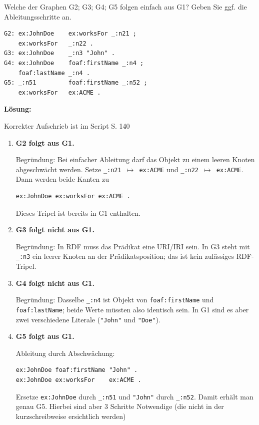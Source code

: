 \documentclass[a4paper]{article}
\begin{document}
Welche der Graphen G2; G3; G4; G5 folgen einfach aus G1?
Geben Sie ggf. die Ableitungsschritte an.

\begin{lstlisting}
G2: ex:JohnDoe    ex:worksFor _:n21 ;
    ex:worksFor   _:n22 .
G3: ex:JohnDoe    _:n3 "John" .
G4: ex:JohnDoe    foaf:firstName _:n4 ;
    foaf:lastName _:n4 .
G5: _:n51         foaf:firstName _:n52 ;
    ex:worksFor   ex:ACME .
\end{lstlisting}

\textbf{Lösung:}

Korrekter Aufschrieb ist im Script S. 140

\begin{enumerate}
    \item \textbf{G2 folgt aus G1.}

    Begründung: Bei einfacher Ableitung darf das Objekt zu einem leeren Knoten abgeschwächt werden.
    Setze \texttt{\_:n21 $\mapsto$ ex:ACME} und \texttt{\_:n22 $\mapsto$ ex:ACME}. Dann werden beide Kanten zu

    \begin{lstlisting}
ex:JohnDoe ex:worksFor ex:ACME .
    \end{lstlisting}

    Dieses Tripel ist bereits in G1 enthalten.

    \item \textbf{G3 folgt nicht aus G1.}

    Begründung: In RDF muss das Prädikat eine URI/IRI sein. In G3 steht mit \texttt{\_:n3} ein leerer Knoten an der Prädikatsposition; das ist kein zulässiges RDF-Tripel.

    \item \textbf{G4 folgt nicht aus G1.}

    Begründung: Dasselbe \texttt{\_:n4} ist Objekt von \texttt{foaf:firstName} und \texttt{foaf:lastName}; beide Werte müssten also identisch sein. In G1 sind es aber zwei verschiedene Literale (\texttt{"John"} und \texttt{"Doe"}).

    \item \textbf{G5 folgt aus G1.}

    Ableitung durch Abschwächung:

    \begin{lstlisting}
ex:JohnDoe foaf:firstName "John" .
ex:JohnDoe ex:worksFor    ex:ACME .
    \end{lstlisting}

    Ersetze \texttt{ex:JohnDoe} durch \texttt{\_:n51} und \texttt{"John"} durch \texttt{\_:n52}. Damit erhält man genau G5. Hierbei sind aber 3 Schritte Notwendige (die nicht in der kurzschreibweise ersichtlich werden)
\end{enumerate}
\end{document}
